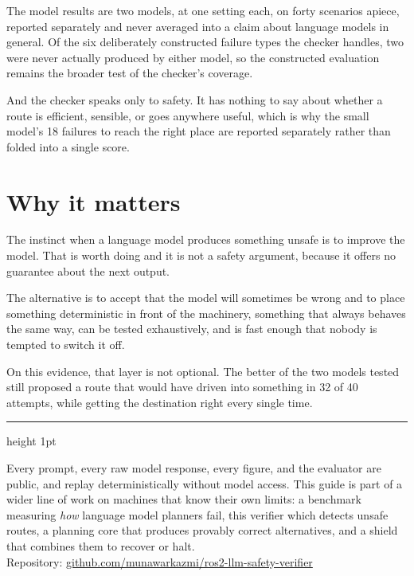 \documentclass[11pt,a4paper]{article}
\begin{document}
The model results are two models, at one setting each, on forty scenarios apiece, reported separately and never averaged into a claim about language models in general. Of the six deliberately constructed failure types the checker handles, two were never actually produced by either model, so the constructed evaluation remains the broader test of the checker's coverage.

And the checker speaks only to safety. It has nothing to say about whether a route is efficient, sensible, or goes anywhere useful, which is why the small model's 18 failures to reach the right place are reported separately rather than folded into a single score.

\section{Why it matters}

The instinct when a language model produces something unsafe is to improve the model. That is worth doing and it is not a safety argument, because it offers no guarantee about the next output.

The alternative is to accept that the model will sometimes be wrong and to place something deterministic in front of the machinery, something that always behaves the same way, can be tested exhaustively, and is fast enough that nobody is tempted to switch it off.

On this evidence, that layer is not optional. The better of the two models tested still proposed a route that would have driven into something in 32 of 40 attempts, while getting the destination right every single time.

\vspace{6pt}
{\color{rule}\hrule height 1pt}
\vspace{6pt}

{\small Every prompt, every raw model response, every figure, and the evaluator are public, and replay deterministically without model access. This guide is part of a wider line of work on machines that know their own limits: a benchmark measuring \emph{how} language model planners fail, this verifier which detects unsafe routes, a planning core that produces provably correct alternatives, and a shield that combines them to recover or halt.\\
Repository: \href{https://github.com/munawarkazmi/ros2-llm-safety-verifier}{github.com/munawarkazmi/ros2-llm-safety-verifier}}
\end{document}
